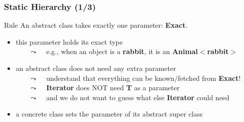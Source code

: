 \begin{frame}
  \frametitle{\scoop Static Hierarchy (1/3)}

  \begin{block}{Rule}
    An abstract class takes exactly one parameter: \textbf{Exact}.
  \end{block}

  \medskip

  \begin{itemize}
    \item this parameter holds its exact type\\
      ~~~ {\scriptsize $\leadsto$ ~ e.g., when an object is a \textbf{rabbit}, it is an \textbf{Animal$<$rabbit$>$} }
      \smallskip
    \item an abstract class does not need any extra parameter\\
      ~~~ {\scriptsize $\leadsto$ ~ understand that everything can be known/fetched from \textbf{Exact}! }\\
      ~~~ {\scriptsize $\leadsto$ ~ \textbf{Iterator} does NOT need \textbf{T} as a parameter }\\
      ~~~ {\scriptsize $\leadsto$ ~ and we do not want to guess what else \textbf{Iterator} could need }
      \smallskip
    \item a concrete class sets the parameter of its abstract super class
    \end{itemize}

\end{frame}





